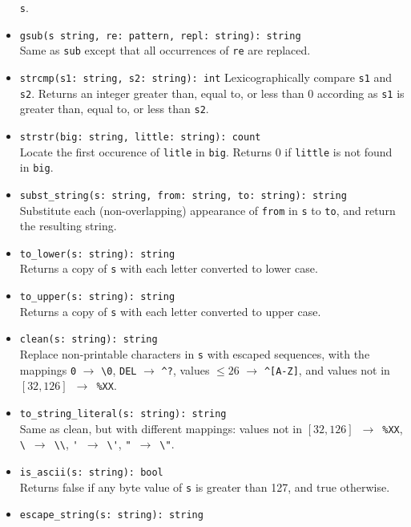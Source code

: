 \documentclass[10pt,landscape]{article}
\begin{document}
\begin{multicols*}{2}
\begin{itemize}
    \texttt{s}.
  \item \verb|gsub(s string, re: pattern, repl: string): string|\\
    Same as \texttt{sub} except that all occurrences of \texttt{re} are
    replaced.
  \item \verb|strcmp(s1: string, s2: string): int|
    Lexicographically compare \texttt{s1} and \texttt{s2}. Returns an integer
    greater than, equal to, or less than 0 according as \texttt{s1} is greater
    than, equal to, or less than \texttt{s2}.
  \item \verb|strstr(big: string, little: string): count|\\
    Locate the first occurence of \texttt{litle} in \texttt{big}.
    Returns 0 if \texttt{little} is not found in \texttt{big}.
  \item \verb|subst_string(s: string, from: string, to: string): string|\\
    Substitute each (non-overlapping) appearance of \texttt{from} in
    \texttt{s} to \texttt{to}, and return the resulting string.
  \item \verb|to_lower(s: string): string|\\
    Returns a copy of \texttt{s} with each letter converted to lower case.
  \item \verb|to_upper(s: string): string|\\
    Returns a copy of \texttt{s} with each letter converted to upper case.
  \item \verb|clean(s: string): string|\\
    Replace non-printable characters in \texttt{s} with escaped sequences,
    with the mappings
    \verb|0| $\rightarrow$ \verb|\0|, 
    \verb|DEL| $\rightarrow$ \verb|^?|,
    values $\le 26$ $\rightarrow$ \verb|^[A-Z]|,
    and values not in $[32, 126]$~$\rightarrow$~\verb|%XX|.
  \item \verb|to_string_literal(s: string): string|\\
    Same as clean, but with different mappings: 
    values not in $[32, 126]$~$\rightarrow$~\verb|%XX|,
    \verb|\|~$\rightarrow$~\verb|\\|, 
    \verb|'|~$\rightarrow$~\verb|\'|,
    \verb|"|~$\rightarrow$~\verb|\"|.
  \item \verb|is_ascii(s: string): bool|\\
    Returns false if any byte value of \texttt{s} is greater than 127, and true
    otherwise.
  \item \verb|escape_string(s: string): string|\\

\end{itemize}
\end{multicols*}
\end{document}
